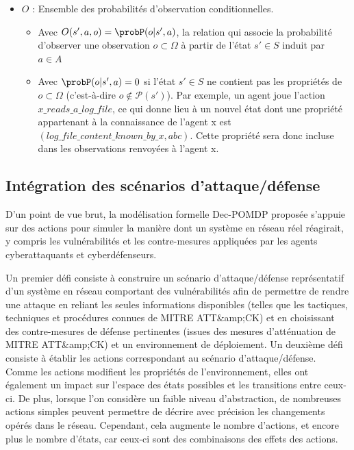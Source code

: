 \begin{itemize}
    \item $O$ : Ensemble des probabilités d'observation conditionnelles.
    \begin{itemize}
        \item Avec $O(s',a,o) = \probP(o|s',a)$, la relation qui associe la probabilité d'observer une observation $o \subset \Omega$ à partir de l'état $s' \in S$ induit par $a \in A$
        \item Avec $\probP(o|s',a) = 0$ si l'état $s' \in S$ ne contient pas les propriétés de $o \subset \Omega$ (c'est-à-dire $o \not\in \mathcal{P}(s')$). Par exemple, un agent joue l'action $x\_reads\_a\_log\_file$, ce qui donne lieu à un nouvel état dont une propriété appartenant à la connaissance de l'agent x est $(log\_file\_content\_known\_by\_x, \allowbreak abc)$. Cette propriété sera donc incluse dans les observations renvoyées à l'agent x. 
    \end{itemize}

\end{itemize}


\subsection{Intégration des scénarios d'attaque/défense\label{sec:ad_integration}}

\noindent
D'un point de vue brut, la modélisation formelle Dec-POMDP proposée s'appuie sur des actions pour simuler la manière dont un système en réseau réel réagirait, y compris les vulnérabilités et les contre-mesures appliquées par les agents cyberattaquants et cyberdéfenseurs.

Un premier défi consiste à construire un scénario d'attaque/défense représentatif d'un système en réseau comportant des vulnérabilités afin de permettre de rendre une attaque en reliant les seules informations disponibles (telles que les tactiques, techniques et procédures connues de MITRE ATT\&amp;CK) et en choisissant des contre-mesures de défense pertinentes (issues des mesures d'atténuation de MITRE ATT\&amp;CK) et un environnement de déploiement. Un deuxième défi consiste à établir les actions correspondant au scénario d'attaque/défense. Comme les actions modifient les propriétés de l'environnement, elles ont également un impact sur l'espace des états possibles et les transitions entre ceux-ci.
De plus, lorsque l'on considère un faible niveau d'abstraction, de nombreuses actions simples peuvent permettre de décrire avec précision les changements opérés dans le réseau. Cependant, cela augmente le nombre d'actions, et encore plus le nombre d'états, car ceux-ci sont des combinaisons des effets des actions.

